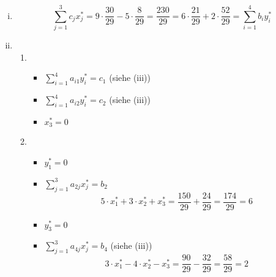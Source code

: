\documentclass[a4paper]{scrartcl}
\begin{document}
\begin{enumerate}[label=\bfseries\arabic*.]
\begin{enumerate}
\begin{enumerate}[(i)]
                    \item
                        \begin{equation}
                            \sum_{j=1}^3 c_jx_j^* = 9 \cdot \frac{30}{29} - 5 \cdot \frac{8}{29} = \frac{230}{29} = 6 \cdot \frac{21}{29} + 2 \cdot \frac{52}{29} = \sum_{i=1}^4 b_iy_i^*
                        \end{equation}

                    \item
                        \begin{enumerate}
                            \item
                                \begin{itemize}
                                    \item $\sum_{i=1}^4 a_{i1}y_i^* = c_1$ (siehe (iii))

                                    \item $\sum_{i=1}^4 a_{i2}y_i^* = c_2$ (siehe (iii))

                                    \item $x_3^* = 0$

                                \end{itemize}

                            \item
                                \begin{itemize}
                                    \item $y_1^* = 0$

                                    \item $\sum_{j=1}^3 a_{2j}x_j^* = b_2$ \\
                                        \begin{equation}
                                            5 \cdot x_1^* + 3 \cdot x_2^* + x_3^* = \frac{150}{29} + \frac{24}{29} = \frac{174}{29} = 6
                                        \end{equation}
                                        
                                    \item $y_3^* = 0$

                                    \item $\sum_{j=1}^3 a_{4j}x_j^* = b_4$ (siehe (iii))
                                        \begin{equation}
                                            3 \cdot x_1^* - 4 \cdot x_2^* - x_3^* = \frac{90}{29} - \frac{32}{29} = \frac{58}{29} = 2
                                        \end{equation}
                                        

\end{itemize}
\end{enumerate}
\end{enumerate}
\end{enumerate}
\end{enumerate}
\end{document}
